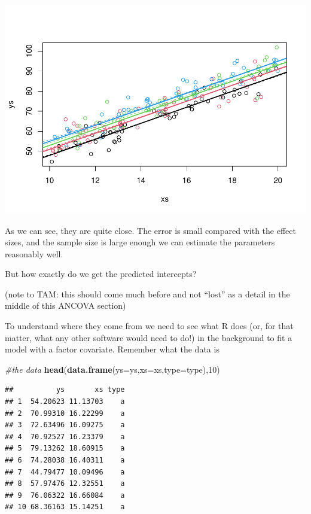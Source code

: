 \documentclass[
]{book}
\newenvironment{Shaded}{\begin{snugshade}}{\end{snugshade}}
\newcommand{\AttributeTok}[1]{\textcolor[rgb]{0.13,0.29,0.53}{#1}}
\newcommand{\CommentTok}[1]{\textcolor[rgb]{0.56,0.35,0.01}{\textit{#1}}}
\newcommand{\DecValTok}[1]{\textcolor[rgb]{0.00,0.00,0.81}{#1}}
\newcommand{\FunctionTok}[1]{\textcolor[rgb]{0.13,0.29,0.53}{\textbf{#1}}}
\newcommand{\NormalTok}[1]{#1}
\begin{document}
\includegraphics{ECOMODbook_files/figure-latex/a9.8-1.pdf}

As we can see, they are quite close. The error is small compared with the effect sizes, and the sample size is large enough we can estimate the parameters reasonably well.

But how exactly do we get the predicted intercepts?

(note to TAM: this should come much before and not ``lost'' as a detail in the middle of this ANCOVA section)

To understand where they come from we need to see what R does (or, for that matter, what any other software would need to do!) in the background to fit a model with a factor covariate. Remember what the data is

\begin{Shaded}
\begin{Highlighting}[]
\CommentTok{\#the data}
\FunctionTok{head}\NormalTok{(}\FunctionTok{data.frame}\NormalTok{(}\AttributeTok{ys=}\NormalTok{ys,}\AttributeTok{xs=}\NormalTok{xs,}\AttributeTok{type=}\NormalTok{type),}\DecValTok{10}\NormalTok{)}
\end{Highlighting}
\end{Shaded}

\begin{verbatim}
##          ys       xs type
## 1  54.20623 11.13703    a
## 2  70.99310 16.22299    a
## 3  72.63496 16.09275    a
## 4  70.92527 16.23379    a
## 5  79.13262 18.60915    a
## 6  74.28038 16.40311    a
## 7  44.79477 10.09496    a
## 8  57.97476 12.32551    a
## 9  76.06322 16.66084    a
## 10 68.36163 15.14251    a
\end{verbatim}
\end{document}
